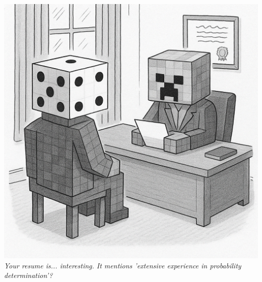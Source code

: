 \vspace{2em}
\begin{center}
    \includegraphics[height=20\baselineskip]{22_MinecraftCreeper/DICE.png}\\
    {\small\textit{Your resume is... interesting. It mentions 'extensive experience in probability determination'?}}
\end{center}
